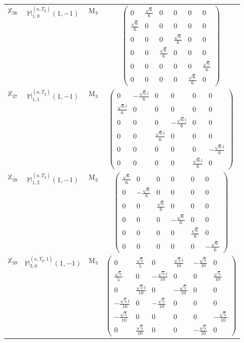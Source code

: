 \documentclass[fleqn,10pt,landscape]{article}
\begin{document}
\begin{itemize}
\begin{center}
\begin{longtable}{c|c|c|c}
$ \mathbb{X}_{36} $ & $\mathbb{M}_{1,0}^{(a,T_{g})}(1,-1)$ & M$_{3}$ & $\begin{pmatrix} 0 & \frac{\sqrt{6}}{6} & 0 & 0 & 0 & 0 \\ \frac{\sqrt{6}}{6} & 0 & 0 & 0 & 0 & 0 \\ 0 & 0 & 0 & \frac{\sqrt{6}}{6} & 0 & 0 \\ 0 & 0 & \frac{\sqrt{6}}{6} & 0 & 0 & 0 \\ 0 & 0 & 0 & 0 & 0 & \frac{\sqrt{6}}{6} \\ 0 & 0 & 0 & 0 & \frac{\sqrt{6}}{6} & 0 \end{pmatrix}$ \\
$ \mathbb{X}_{37} $ & $\mathbb{M}_{1,1}^{(a,T_{g})}(1,-1)$ & M$_{3}$ & $\begin{pmatrix} 0 & - \frac{\sqrt{6} i}{6} & 0 & 0 & 0 & 0 \\ \frac{\sqrt{6} i}{6} & 0 & 0 & 0 & 0 & 0 \\ 0 & 0 & 0 & - \frac{\sqrt{6} i}{6} & 0 & 0 \\ 0 & 0 & \frac{\sqrt{6} i}{6} & 0 & 0 & 0 \\ 0 & 0 & 0 & 0 & 0 & - \frac{\sqrt{6} i}{6} \\ 0 & 0 & 0 & 0 & \frac{\sqrt{6} i}{6} & 0 \end{pmatrix}$ \\
$ \mathbb{X}_{38} $ & $\mathbb{M}_{1,2}^{(a,T_{g})}(1,-1)$ & M$_{3}$ & $\begin{pmatrix} \frac{\sqrt{6}}{6} & 0 & 0 & 0 & 0 & 0 \\ 0 & - \frac{\sqrt{6}}{6} & 0 & 0 & 0 & 0 \\ 0 & 0 & \frac{\sqrt{6}}{6} & 0 & 0 & 0 \\ 0 & 0 & 0 & - \frac{\sqrt{6}}{6} & 0 & 0 \\ 0 & 0 & 0 & 0 & \frac{\sqrt{6}}{6} & 0 \\ 0 & 0 & 0 & 0 & 0 & - \frac{\sqrt{6}}{6} \end{pmatrix}$ \\
$ \mathbb{X}_{39} $ & $\mathbb{M}_{3,0}^{(a,T_{g},1)}(1,-1)$ & M$_{3}$ & $\begin{pmatrix} 0 & \frac{\sqrt{5}}{5} & 0 & \frac{\sqrt{5} i}{10} & - \frac{\sqrt{5}}{10} & 0 \\ \frac{\sqrt{5}}{5} & 0 & - \frac{\sqrt{5} i}{10} & 0 & 0 & \frac{\sqrt{5}}{10} \\ 0 & \frac{\sqrt{5} i}{10} & 0 & - \frac{\sqrt{5}}{10} & 0 & 0 \\ - \frac{\sqrt{5} i}{10} & 0 & - \frac{\sqrt{5}}{10} & 0 & 0 & 0 \\ - \frac{\sqrt{5}}{10} & 0 & 0 & 0 & 0 & - \frac{\sqrt{5}}{10} \\ 0 & \frac{\sqrt{5}}{10} & 0 & 0 & - \frac{\sqrt{5}}{10} & 0 \end{pmatrix}$ \\

\end{longtable}
\end{center}
\end{itemize}
\end{document}
